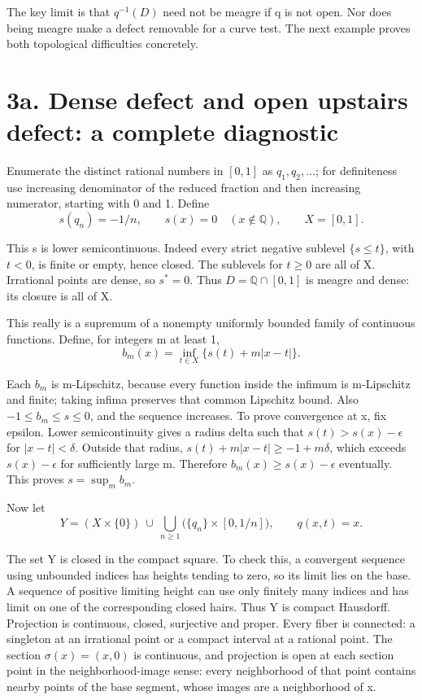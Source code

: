 \documentclass[11pt,a4paper]{article}
\begin{document}
The key limit is that \(q^{-1}(D)\) need not be meagre if q is not open. Nor does being meagre make a defect removable for a curve test. The next example proves both topological difficulties concretely.

\section*{3a. Dense defect and open upstairs defect: a complete diagnostic}

Enumerate the distinct rational numbers in \([0,1]\) as \(q_1,q_2,\ldots\); for definiteness use increasing denominator of the reduced fraction and then increasing numerator, starting with 0 and 1. Define
\[
s(q_n)=-1/n,\qquad s(x)=0\quad(x\notin\mathbb Q),\qquad X=[0,1].
\tag{8}
\]

This s is lower semicontinuous. Indeed every strict negative sublevel \(\{s\leq t\}\), with \(t<0\), is finite or empty, hence closed. The sublevels for \(t\geq0\) are all of X. Irrational points are dense, so \(s^*=0\). Thus \(D=\mathbb Q\cap[0,1]\) is meagre and dense: its closure is all of X.

This really is a supremum of a nonempty uniformly bounded family of continuous functions. Define, for integers m at least 1,
\[
b_m(x)=\inf_{t\in X}\{s(t)+m|x-t|\}.
\tag{9}
\]

Each \(b_m\) is m-Lipschitz, because every function inside the infimum is m-Lipschitz and finite; taking infima preserves that common Lipschitz bound. Also \(-1\leq b_m\leq s\leq0\), and the sequence increases. To prove convergence at x, fix epsilon. Lower semicontinuity gives a radius delta such that \(s(t)>s(x)-\epsilon\) for \(|x-t|<\delta\). Outside that radius, \(s(t)+m|x-t|\geq-1+m\delta\), which exceeds \(s(x)-\epsilon\) for sufficiently large m. Therefore \(b_m(x)\geq s(x)-\epsilon\) eventually. This proves \(s=\sup_m b_m\).

Now let
\[
Y=(X\times\{0\})\ \cup\ \bigcup_{n\geq1}\bigl(\{q_n\}\times[0,1/n]\bigr),
\qquad q(x,t)=x.
\tag{10}
\]

The set Y is closed in the compact square. To check this, a convergent sequence using unbounded indices has heights tending to zero, so its limit lies on the base. A sequence of positive limiting height can use only finitely many indices and has limit on one of the corresponding closed hairs. Thus Y is compact Hausdorff. Projection is continuous, closed, surjective and proper. Every fiber is connected: a singleton at an irrational point or a compact interval at a rational point. The section \(\sigma(x)=(x,0)\) is continuous, and projection is open at each section point in the neighborhood-image sense: every neighborhood of that point contains nearby points of the base segment, whose images are a neighborhood of x.
\end{document}
